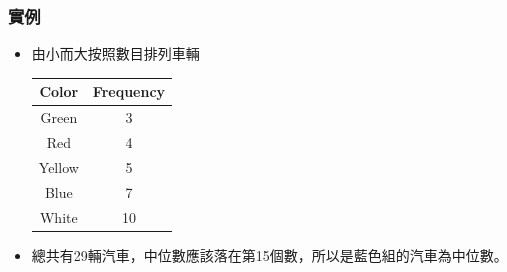 \documentclass{beamer}
\begin{document}
\begin{frame}\frametitle{實例}
\begin{itemize}
\item 由小而大按照數目排列車輛
\begin{table}
\begin{tabular}{| c |  c |}
\hline
Color & Frequency \\
\hline
Green & 3 \\
Red & 4 \\
Yellow & 5 \\
Blue & 7 \\
White & 10 \\
\hline
\end{tabular}
\end{table}
\item 總共有29輛汽車，中位數應該落在第15個數，所以是藍色組的汽車為中位數。
\end{itemize}
\end{frame}
\end{document}

